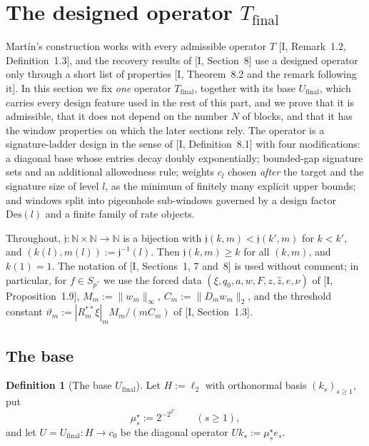 \documentclass[10pt]{amsart}
\theoremstyle{definition}
\newtheorem{definition}[theorem]{Definition}
\theoremstyle{remark}
\newcommand{\N}{\mathbb N}
\newcommand{\zh}{\hat z}
\begin{document}

\section{The designed operator $T_{\mathrm{final}}$}\label{sec:II-Tfinal}

Mart\'in's construction works with every admissible operator $T$
[I, Remark~1.2, Definition~1.3], and the recovery results of
[I, Section~8] use a designed operator only through a short list
of properties [I, Theorem~8.2 and the remark following it].  In
this section we fix \emph{one} operator $T_{\mathrm{final}}$, together with
its base $U_{\mathrm{final}}$, which carries every design feature used in
the rest of this part, and we prove that it is admissible, that it does
not depend on the number $N$ of blocks, and that it has the window
properties on which the later sections rely.  The operator is a
signature-ladder design in the sense of [I, Definition~8.1] with
four modifications: a diagonal base whose entries decay doubly
exponentially; bounded-gap signature sets and an additional allowedness
rule; weights $c_l$ chosen \emph{after} the target and the signature size
of level $l$, as the minimum of finitely many explicit upper bounds; and
windows split into pigeonhole sub-windows governed by a design factor
$\mathrm{Des}(l)$ and a finite family of rate objects.

Throughout, $\mathfrak j:\N\times\N\to\N$ is a bijection with
$\mathfrak j(k,m)<\mathfrak j(k',m)$ for $k<k'$, and
$(k(l),m(l)):=\mathfrak j^{-1}(l)$.  Then $\mathfrak j(k,m)\ge k$ for all
$(k,m)$, and $k(1)=1$.  The notation of [I, Sections~1, 7 and~8]
is used without comment; in particular, for $f\in S_{p^*}$ we use the
forced data $(\xi,q_0,a,w,F,z,\zh,e,\nu)$ of
[I, Proposition~1.9], $M_m:=\|w_m\|_\infty$,
$C_m:=\|D_mw_m\|_2$, and the threshold constant
$\vartheta_m:=|R_m^{**}\xi|_mM_m/(mC_m)$ of [I, Section~1.3].

\subsection{The base}

\begin{definition}[The base $U_{\mathrm{final}}$]\label{def:II-base}
Let $H:=\ell_2$ with orthonormal basis $(k_s)_{s\ge1}$, put
\[
 \mu^\star_s:=2^{-2^{2^s}}\qquad(s\ge1),
\]
and let $U=U_{\mathrm{final}}:H\to c_0$ be the diagonal operator
$Uk_s:=\mu^\star_se_s$.
\end{definition}
\end{document}
